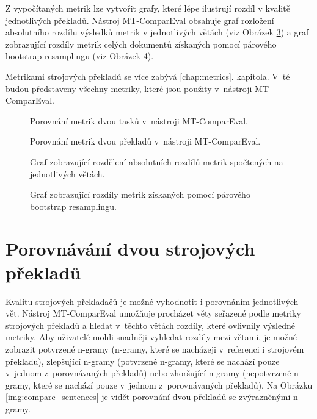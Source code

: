 Z vypočítaných metrik lze vytvořit grafy,
  které lépe ilustrují rozdíl v kvalitě jednotlivých překladů.
Nástroj MT-ComparEval obsahuje graf rozložení absolutního rozdílu výsledků metrik v jednotlivých větách (viz Obrázek \ref{img:chart-metrics-sentences})
  a graf zobrazující rozdíly metrik celých dokumentů získaných pomocí párového bootstrap resamplingu (viz Obrázek \ref{img:chart-metrics-bs}).

Metrikami strojových překladů se více zabývá \ref{chap:metrics}. kapitola.
V~té budou představeny všechny metriky,
  které jsou použity v~nástroji MT-ComparEval.


\begin{figure}
	\caption{Porovnání metrik dvou tasků v~nástroji MT-ComparEval.}
	\label{img:compare_metrics_tasks}
\end{figure}

\begin{figure}
	\caption{Porovnání metrik dvou překladů v~nástroji MT-ComparEval.}
	\label{img:compare_metrics_sentences}
\end{figure}

\begin{figure}
	\caption{Graf zobrazující rozdělení absolutních rozdílů metrik spočtených na jednotlivých větách.}
	\label{img:chart-metrics-sentences}
\end{figure}

\begin{figure}
	\caption{Graf zobrazující rozdíly metrik získaných pomocí párového bootstrap resamplingu.}
	\label{img:chart-metrics-bs}
\end{figure}

\section{Porovnávání dvou strojových překladů}
Kvalitu strojových překladačů je možné vyhodnotit i porovnáním jednotlivých vět.
Nástroj MT-ComparEval umožňuje procházet věty seřazené podle metriky strojových překladů 
  a hledat v~těchto větách rozdíly,
  které ovlivnily výsledné metriky.
Aby uživatelé mohli snadněji vyhledat rozdíly mezi větami,
  je možné zobrazit potvrzené \mbox{n-gramy} (\mbox{n-gramy}, které se nacházeji v~referenci i strojovém překladu),
  zlepšující \mbox{n-gramy} (potvrzené \mbox{n-gramy}, které se nachází pouze v~jednom z~porovnávaných překladů)
  nebo zhoršující \mbox{n-gramy} (nepotvrzené \mbox{n-gramy}, které se nachází pouze v~jednom z~porovnávaných překladů).
Na Obrázku \ref{img:compare_sentences} je vidět porovnání dvou překladů se zvýrazněnými \mbox{n-gramy}.

